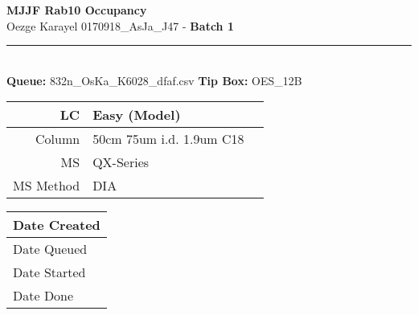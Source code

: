 \documentclass[11pt,a4paper]{memoir}
\begin{document}
	\begin{center}\hdashrule{\textwidth}{1pt}{1pt}\end{center}

    \noindent
    \textbf{\Huge{MJJF Rab10 Occupancy}}\\
    \Large{Oezge Karayel \hfill 0170918\_AsJa\_J47 - \textbf{Batch 1}}\\
    \rule{\textwidth}{.3mm}\\
    \normalsize{\textbf{Queue:} 832n\_OsKa\_K6028\_dfaf.csv}
    \hfill 
    \textbf{Tip Box:} OES\_12B 
	\vspace{3mm}

	\begin{minipage}[t]{\textwidth}
	    \begin{minipage}[t][4cm]{0.4\textwidth}
		    \strut\vspace*{-\baselineskip}\newline
	        {\normalsize
	        	\begin{tabular}{| r p{3cm} | p{1cm} |}
	        		\hline
	            	{\color{gray}LC} & Easy (Model) & \hfill{}\\
	            	\hline
	            	{\color{gray}Column} & 50cm 75um i.d. 1.9um C18 & \hfill{}\\
	            	\hline
	            	{\color{gray}MS} & QX-Series & \hfill{}\\
	            	\hline
	            	{\color{gray}MS Method} & DIA & \hfill{}\\
	            	\hline
	            \end{tabular}
	        }
	    \end{minipage}
	    \begin{minipage}[]{0.35\textwidth}
		    \strut\vspace*{-\baselineskip}\newline
	    \end{minipage}    
	    \begin{minipage}[t]{0.15\textwidth}
	    		\small
		    \strut\vspace*{-\baselineskip}\newline
	    		\begin{tabular}{|p{\textwidth}|}
	    		 \hline
	    		 {\color{lightgray}Date Created}\\
	    		 \hline    		 
	    		 {\color{lightgray}Date Queued}\\
	    		 \hline
	    		 {\color{lightgray}Date Started}\\
	    		 \hline
	    		 {\color{lightgray}Date Done}\\    		     		 
	    		 \hline
	    		\end{tabular}\\
	    \end{minipage}
	    	    		\vspace{1mm} \\
    \end{minipage}
    
\end{document}
